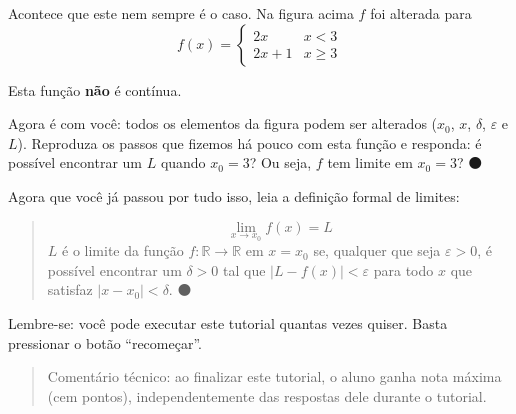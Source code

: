 \documentclass[fleqn,12pt]{scrartcl}
\newenvironment{ct}{\begin{quotation}\color{red!30!black}\sffamily\small Comentário técnico: }{\end{quotation}} %
\newcommand\proceed{\textcolor{green!50!black}{$\medbullet$}\xspace}
\begin{document}
    Acontece que este nem sempre é o caso. Na figura acima $f$ foi alterada para   
    \begin{equation*}
	f(x) = \begin{cases}
	    2x & x < 3 \\
	    2x + 1 & x \ge 3
	\end{cases}
    \end{equation*} 

    Esta função \textbf{não} é contínua.

    Agora é com você: todos os elementos da figura podem ser alterados ($x_0$, $x$, $\delta$, $\varepsilon$ e $L$). Reproduza os passos que fizemos há pouco com esta função e responda: é possível encontrar um $L$ quando $x_0 = 3$? Ou seja, $f$ tem limite em $x_0 = 3$? \proceed

    Agora que você já passou por tudo isso, leia a definição formal de limites:
    \begin{quotation}
	\begin{equation*}	
	    \lim_{x \to x_0} f(x) = L
	\end{equation*}
	$L$ é o limite da função $f:\mathbb{R} \to \mathbb{R}$ em $x = x_0$ se, qualquer que seja $\varepsilon > 0$, é possível encontrar um $\delta > 0$ tal que $|L - f(x)| < \varepsilon$ para todo $x$ que satisfaz $|x - x_0| < \delta$. \proceed
    \end{quotation}

    Lembre-se: você pode executar este tutorial quantas vezes quiser. Basta pressionar o botão ``recomeçar''.

    \begin{ct}
	ao finalizar este tutorial, o aluno ganha nota máxima (cem pontos), independentemente das respostas dele durante o tutorial.
    \end{ct}
\end{document}
